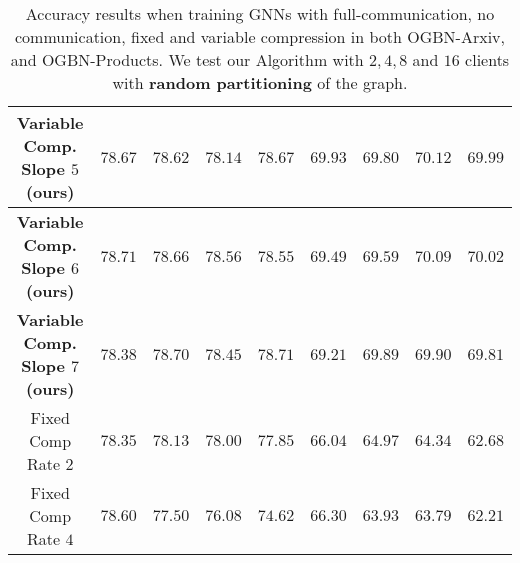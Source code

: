 \begin{table*}
\begin{tabular}{c|cccc|cccc}
\textbf{Variable Comp. Slope $5$(ours)}& \multicolumn{1}{c|}{$78.67$} & \multicolumn{1}{c|}{$78.62$} & \multicolumn{1}{c|}{$78.14$} & \multicolumn{1}{c|}{$78.67$} & \multicolumn{1}{c|}{$69.93$} & \multicolumn{1}{c|}{$69.80$} & \multicolumn{1}{c|}{$70.12$} & \multicolumn{1}{c}{$69.99$} \\ \hline
\textbf{Variable Comp. Slope $6$(ours)}& \multicolumn{1}{c|}{$78.71$} & \multicolumn{1}{c|}{$78.66$} & \multicolumn{1}{c|}{$78.56$} & \multicolumn{1}{c|}{$78.55$} & \multicolumn{1}{c|}{$69.49$} & \multicolumn{1}{c|}{$69.59$} & \multicolumn{1}{c|}{$70.09$} & \multicolumn{1}{c}{$70.02$} \\ \hline
\textbf{Variable Comp. Slope $7$(ours)}& \multicolumn{1}{c|}{$78.38$} & \multicolumn{1}{c|}{$78.70$} & \multicolumn{1}{c|}{$78.45$} & \multicolumn{1}{c|}{$78.71$} & \multicolumn{1}{c|}{$69.21$} & \multicolumn{1}{c|}{$69.89$} & \multicolumn{1}{c|}{$69.90$} & \multicolumn{1}{c}{$69.81$} \\ \hline
Fixed Comp Rate $2$& \multicolumn{1}{c|}{$78.35$} & \multicolumn{1}{c|}{$78.13$} & \multicolumn{1}{c|}{$78.00$} & \multicolumn{1}{c|}{$77.85$} & \multicolumn{1}{c|}{$66.04$} & \multicolumn{1}{c|}{$64.97$} & \multicolumn{1}{c|}{$64.34$} & \multicolumn{1}{c}{$62.68$} \\ \hline
Fixed Comp Rate $4$& \multicolumn{1}{c|}{$78.60$} & \multicolumn{1}{c|}{$77.50$} & \multicolumn{1}{c|}{$76.08$} & \multicolumn{1}{c|}{$74.62$} & \multicolumn{1}{c|}{$66.30$} & \multicolumn{1}{c|}{$63.93$} & \multicolumn{1}{c|}{$63.79$} & \multicolumn{1}{c}{$62.21$} \\ \hline
	\end{tabular}
\caption{\label{table:results_random} Accuracy results when training GNNs with full-communication, no communication, fixed and variable compression in both OGBN-Arxiv, and OGBN-Products. We test our Algorithm with $2,4,8$ and $16$ clients with \textbf{random partitioning} of the graph. }
\end{table*}